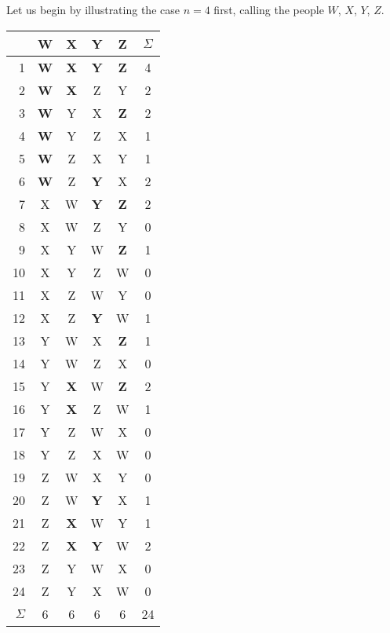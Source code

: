 \documentclass[11pt]{scrartcl}
\begin{document}
Let us begin by illustrating the case $n=4$ first, calling the people $W$, $X$, $Y$, $Z$.
\begin{center}
\begin{tabular}[h]{r|cccc|c}
	& W & X & Y & Z & $\Sigma$ \\ \hline\hline

1 & \textbf{\color{red} W} & \textbf{\color{red} X} & \textbf{\color{red} Y} & \textbf{\color{red} Z} & 4 \\
2 & \textbf{\color{red} W} & \textbf{\color{red} X} & Z & Y & 2 \\
3 & \textbf{\color{red} W} & Y & X & \textbf{\color{red} Z} & 2 \\
4 & \textbf{\color{red} W} & Y & Z & X & 1 \\
5 & \textbf{\color{red} W} & Z & X & Y & 1 \\
6 & \textbf{\color{red} W} & Z & \textbf{\color{red} Y} & X & 2 \\
7 & X & W & \textbf{\color{red} Y} & \textbf{\color{red} Z} & 2 \\
8 & X & W & Z & Y & 0 \\
9 & X & Y & W & \textbf{\color{red} Z} & 1 \\
10 & X & Y & Z & W & 0 \\
11 & X & Z & W & Y & 0 \\
12 & X & Z & \textbf{\color{red} Y} & W & 1 \\
13 & Y & W & X & \textbf{\color{red} Z} & 1 \\
14 & Y & W & Z & X & 0 \\
15 & Y & \textbf{\color{red} X} & W & \textbf{\color{red} Z} & 2 \\
16 & Y & \textbf{\color{red} X} & Z & W & 1 \\
17 & Y & Z & W & X & 0 \\
18 & Y & Z & X & W & 0 \\
19 & Z & W & X & Y & 0 \\
20 & Z & W & \textbf{\color{red} Y} & X & 1 \\
21 & Z & \textbf{\color{red} X} & W & Y & 1 \\
22 & Z & \textbf{\color{red} X} & \textbf{\color{red} Y} & W & 2 \\
23 & Z & Y & W & X & 0 \\
24 & Z & Y & X & W & 0 \\

\hline
$\Sigma$ & 6 & 6 & 6 & 6 & 24
\end{tabular}
\end{center}
\end{document}
